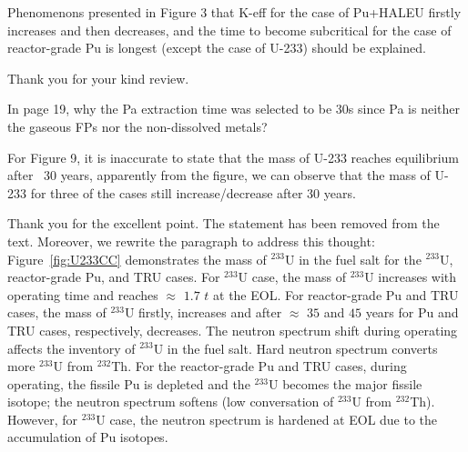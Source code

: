 \documentclass[answers,11pt]{exam}
\begin{document}
\begin{questions}
\begin{solution}
        \end{solution}


        \question Phenomenons presented in Figure 3 that K-eff for the case of Pu+HALEU firstly increases and then decreases, and the time to become subcritical for the case of reactor-grade Pu is longest (except the case of U-233) should be explained.
        \begin{solution}
                 Thank you for your kind review.
        \end{solution}

        \question In page 19, why the Pa extraction time was selected to be 30s since Pa is neither the gaseous FPs nor the non-dissolved metals?
        \begin{solution}
                  
        \end{solution}

        \question For Figure 9, it is inaccurate to state that the mass of U-233 reaches equilibrium after ~30 years, apparently from the figure, we can observe that the mass of U-233 for three of the cases still increase/decrease after 30 years.
        
        \begin{solution}
                Thank you for the excellent point. The statement has been removed from the text.
                Moreover, we rewrite the paragraph to address this thought:\\
                Figure~\ref{fig:U233CC} demonstrates the mass of $^{233}$U in the fuel salt for the $^{233}$U, reactor-grade Pu, and TRU cases. For $^{233}$U case, the mass of $^{233}$U increases with operating time and reaches $\approx$ $1.7$ $t$ at the EOL. For reactor-grade Pu and TRU cases, the mass of $^{233}$U firstly, increases and after $\approx$ $35$ and $45$ years for Pu and TRU cases, respectively, decreases. The neutron spectrum shift during operating affects the inventory of $^{233}$U in the fuel salt. Hard neutron spectrum converts more $^{233}$U from $^{232}$Th. For the reactor-grade Pu and TRU cases, during operating, the fissile Pu is depleted and the $^{233}$U becomes the major fissile isotope; the neutron spectrum softens (low conversation of $^{233}$U from $^{232}$Th). However, for $^{233}$U case, the neutron spectrum is hardened at EOL due to the accumulation of Pu isotopes.                
                

\end{solution}
\end{questions}
\end{document}
